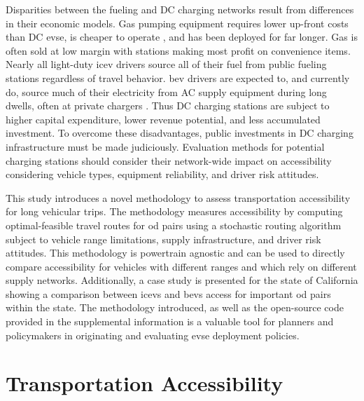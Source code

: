 \documentclass[11pt]{article}
\begin{document}
\begin{multicols}{2}
Disparities between the fueling and DC charging networks result from differences in their economic models. Gas pumping equipment requires lower up-front costs than DC \gls{evse}, is cheaper to operate \cite{Gamage_2023}, and has been deployed for far longer. Gas is often sold at low margin with stations making most profit on convenience items. Nearly all light-duty \gls{icev} drivers source all of their fuel from public fueling stations regardless of travel behavior. \gls{bev} drivers are expected to, and currently do, source much of their electricity from AC supply equipment during long dwells, often at private chargers \cite{Hardman_2018}. Thus DC charging stations are subject to higher capital expenditure, lower revenue potential, and less accumulated investment. To overcome these disadvantages, public investments in DC charging infrastructure must be made judiciously. Evaluation methods for potential charging stations should consider their network-wide impact on accessibility considering vehicle types, equipment reliability, and driver risk attitudes.

This study introduces a novel methodology to assess transportation accessibility for long vehicular trips. The methodology measures accessibility by computing optimal-feasible travel routes for \gls{od} pairs using a stochastic routing algorithm subject to vehicle range limitations, supply infrastructure, and driver risk attitudes. This methodology is powertrain agnostic and can be used to directly compare accessibility for vehicles with different ranges and which rely on different supply networks. Additionally, a case study is presented for the state of California showing a comparison between \glspl{icev} and \glspl{bev} access for important \gls{od} pairs within the state. The methodology introduced, as well as the open-source code provided in the supplemental information is a valuable tool for planners and policymakers in originating and evaluating \gls{evse} deployment policies.

\section*{Transportation Accessibility}


\end{multicols}
\end{document}
